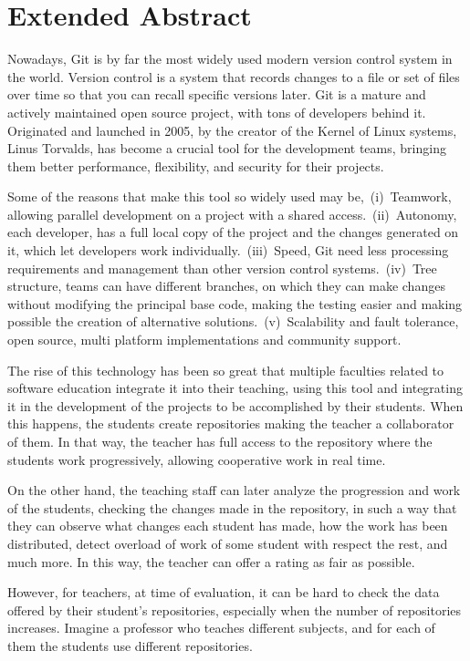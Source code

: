 \chapter*{Extended Abstract\label{00Abstractsummary}}
Nowadays, Git is by far the most widely used modern version control system
in the world. Version control is a system that records changes to a
file or set of files over time so that you can recall specific versions
later. Git is a mature and actively maintained open source project, with
tons of developers behind it. Originated and launched in 2005, by the
creator of the Kernel of Linux systems, Linus Torvalds, has become a
crucial tool for the development teams, bringing them better performance,
flexibility, and security for their projects.

Some of the reasons that make this tool so widely used may
be,~(i)~Teamwork, allowing parallel development on a project with a shared
access.~(ii)~Autonomy, each developer, has a full local copy of the project
and the changes generated on it, which let developers work
individually.~(iii)~Speed, Git need less processing requirements and
management than other version control systems.~(iv)~Tree structure, teams
can have different branches, on which they can make changes without
modifying the principal base code, making the testing easier and making
possible the creation of alternative solutions.~(v)~Scalability and fault
tolerance, open source, multi platform implementations and community
support.

The rise of this technology has been so great that multiple faculties
related to software education integrate it into their teaching, using this
tool and integrating it in the development of the projects to be
accomplished by their students. When this happens, the students create
repositories making the teacher a collaborator of them. In that way, the
teacher has full access to the repository where the students work
progressively, allowing cooperative work in real time.

On the other hand, the teaching staff can later analyze the progression and
work of the students, checking the changes made in the repository, in such
a way that they can observe what changes each student has made, how the
work has been distributed, detect overload of work of some student with
respect the rest, and much more. In this way, the teacher can offer a rating
as fair as possible.

However, for teachers, at time of evaluation, it can be hard to check the
data offered by their student’s repositories, especially when the number of
repositories increases. Imagine a professor who teaches different subjects,
and for each of them the students use different repositories.


